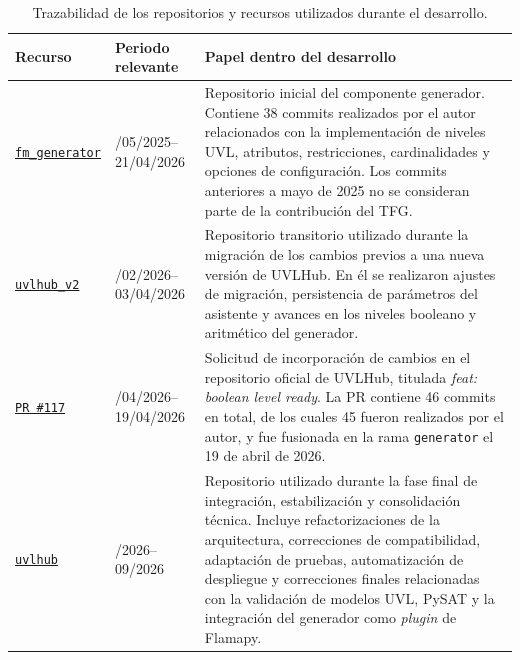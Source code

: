 \begin{table}[H]
\centering
\small
\renewcommand{\arraystretch}{1.15}

\begin{tabularx}{\textwidth}{@{}
    >{\raggedright\arraybackslash}p{}
    >{\centering\arraybackslash}p{}
    >{\raggedright\arraybackslash}X
@{}}
\toprule

\textbf{Recurso} &
\textbf{Periodo relevante} &
\textbf{Papel dentro del desarrollo} \\

\midrule

\href{https://github.com/antjimort/fm_generator}
{\texttt{fm\_generator}} &
15/05/2025--21/04/2026 &
Repositorio inicial del componente generador. Contiene 38 commits realizados
por el autor relacionados con la implementación de niveles UVL, atributos,
restricciones, cardinalidades y opciones de configuración. Los commits
anteriores a mayo de 2025 no se consideran parte de la contribución del TFG. \\[0.4em]

\href{https://github.com/antjimort/uvlhub_v2}
{\texttt{uvlhub\_v2}} &
14/02/2026--03/04/2026 &
Repositorio transitorio utilizado durante la migración de los cambios previos
a una nueva versión de UVLHub. En él se realizaron ajustes de migración,
persistencia de parámetros del asistente y avances en los niveles booleano y
aritmético del generador. \\[0.4em]

\href{https://github.com/diverso-lab/uvlhub/pull/117}
{\texttt{PR \#117}} &
06/04/2026--19/04/2026 &
Solicitud de incorporación de cambios en el repositorio oficial de UVLHub,
titulada \textit{feat: boolean level ready}. La PR contiene 46 commits en
total, de los cuales 45 fueron realizados por el autor, y fue fusionada en la
rama \texttt{generator} el 19 de abril de 2026. \\[0.4em]

\href{https://github.com/antjimort/uvlhub}
{\texttt{uvlhub}} &
05/2026--09/2026 &
Repositorio utilizado durante la fase final de integración, estabilización y
consolidación técnica. Incluye refactorizaciones de la arquitectura,
correcciones de compatibilidad, adaptación de pruebas, automatización de
despliegue y correcciones finales relacionadas con la validación de modelos
UVL, PySAT y la integración del generador como \textit{plugin} de Flamapy. \\

\bottomrule
\end{tabularx}

\caption{Trazabilidad de los repositorios y recursos utilizados durante el desarrollo.}
\label{tab:trazabilidad-repositorios}
\end{table}

